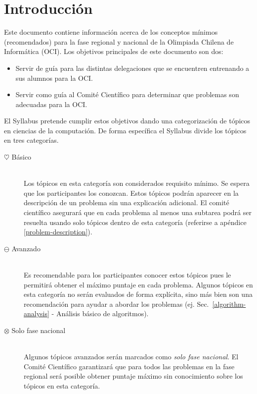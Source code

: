 \documentclass{article}
\newcommand{\basic}{$\heartsuit$}
\newcommand{\advanced}{$\ominus$}
\newcommand{\ultra}{$\otimes$}
\begin{document}
\section{Introducción}\label{sec:intro}
Este documento contiene información acerca de los conceptos mínimos (recomendados)
para la fase regional y nacional de la Olimpiada Chilena de Informática (OCI).
Los objetivos principales de este documento son dos:
\begin{itemize}
  \item Servir de guía para las distintas delegaciones que se encuentren
    entrenando a sus alumnos para la OCI.
  \item Servir como guía al Comité Científico para determinar que problemas son
    adecuadas para la OCI.
\end{itemize}
El Syllabus pretende cumplir estos objetivos dando una categorización de tópicos
en ciencias de la computación.
De forma específica el Syllabus divide los tópicos en tres categorías.
\begin{description}
\item[\basic{} Básico]
  \hspace{1em} \\
  Los tópicos en esta categoría son considerados requisito mínimo.
    Se espera que los participantes los conozcan.
    Estos tópicos podrán aparecer en la descripción de un problema sin una
    explicación adicional.
    El comité científico asegurará que en cada problema al menos una subtarea podrá
    ser resuelta usando solo tópicos dentro de esta categoría (referirse a
    apéndice \ref{problem-description}).
  \item[\advanced{} Avanzado]
    \hspace{1em} \\
    Es recomendable para los participantes conocer estos tópicos pues le
    permitirá obtener el máximo puntaje en cada problema.
    Algunos tópicos en esta categoría no serán evaluados de forma explícita,
    sino más bien son una recomendación para ayudar a abordar los problemas (ej.
    Sec.~\ref{algorithm-analysis} - Análisis básico de algoritmos).
  \item[\ultra{} Solo fase nacional]
    \hspace{1em} \\
    Algunos tópicos avanzados serán marcados como \textit{solo fase nacional}.
    El Comité Científico garantizará que para todos las problemas en la fase
    regional será posible obtener puntaje máximo sin conocimiento sobre los
    tópicos en esta categoría.
\end{description}
\end{document}

